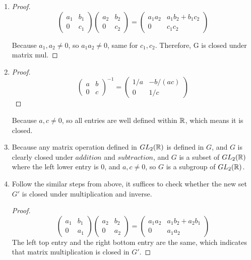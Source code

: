 \begin{enumerate}
	\item \begin{proof}
		      $$
			      \begin{pmatrix}
				      a_1 & b_1 \\
				      0   & c_1
			      \end{pmatrix}
			      \begin{pmatrix}
				      a_2 & b_2 \\
				      0   & c_2
			      \end{pmatrix} =
			      \begin{pmatrix}
				      a_1a_2 & a_1b_2+b_1c_2 \\
				      0      & c_1c_2
			      \end{pmatrix}
		      $$

		      Because $a_1, a_2 \neq 0$, so $a_1a_2\neq 0$, same for $c_1,c_2$.
		      Therefore, G is closed under matrix mul.
	      \end{proof}
	\item \begin{proof}
		      $$
			      \begin{pmatrix}
				      a & b \\
				      0 & c
			      \end{pmatrix}^{-1} =
			      \begin{pmatrix}
				      1/a & -b/(ac) \\
				      0   & 1/c
			      \end{pmatrix}
		      $$
	      \end{proof}

	      Because $a,c\neq 0$, so all entries are well defined within $\mathbb{R}$, which means it is closed.

	\item Because any matrix operation defined in $GL_2(\mathbb{R})$ is defined in $G$,
	      and $G$ is clearly closed under $addition$ and $subtraction$,
	      and $G$ is a subset of $GL_2(\mathbb{R})$ where the left lower entry is $0$, and $a,c \neq 0$,
	      so $G$ is a subgroup of $GL_2(\mathbb{R})$.
	\item Follow the similar steps from above, it suffices to check whether the new set $G'$ is closed under multiplication and inverse.
	      \begin{proof}
		      $$
			      \begin{pmatrix}
				      a_1 & b_1 \\
				      0   & a_1
			      \end{pmatrix}
			      \begin{pmatrix}
				      a_2 & b_2 \\
				      0   & a_2
			      \end{pmatrix} =
			      \begin{pmatrix}
				      a_1a_2 & a_1b_2+a_2b_1 \\
				      0      & a_1a_2
			      \end{pmatrix}
		      $$
		      The left top entry and the right bottom entry are the same,
		      which indicates that matrix multiplication is closed in $G'$.


\end{proof}
\end{enumerate}
